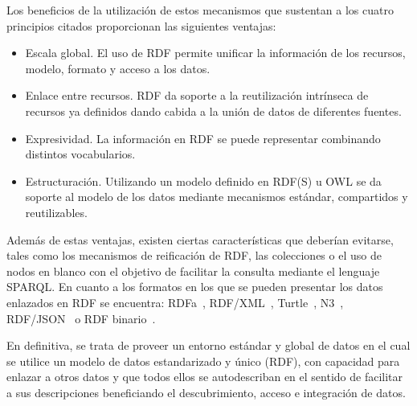 Los beneficios de la utilización de estos mecanismos que sustentan a los cuatro principios citados proporcionan las siguientes ventajas:
\begin{itemize}
 \item Escala global. El uso de \gls{RDF} permite unificar la información de los recursos, modelo, formato y acceso a los datos.
 \item Enlace entre recursos. RDF da soporte a la reutilización intrínseca de recursos ya definidos dando cabida
a la unión de datos de diferentes fuentes.
  \item Expresividad. La información en RDF se puede representar combinando distintos vocabularios.
 \item Estructuración. Utilizando un modelo definido en RDF(S) u \gls{OWL} se da soporte al modelo de los datos
mediante mecanismos estándar, compartidos y reutilizables.
\end{itemize}

Además de estas ventajas, existen ciertas características que deberían evitarse, tales como los mecanismos
de reificación de RDF, las colecciones o el uso de nodos en blanco con el objetivo de facilitar la consulta
mediante el lenguaje SPARQL. En cuanto a los formatos en los que se pueden presentar los datos enlazados en RDF se encuentra:
\gls{RDFa}~\cite{rdfa-primer}, \gls{RDF/XML}~\cite{rdf-syntax}, \gls{Turtle}~\cite{turtle-syntax}, \gls{N3}~\cite{n3-syntax}, \gls{RDF}/\gls{JSON}~\cite{rdf-binario} o RDF binario~\cite{rdf-json}.


En definitiva, se trata de proveer un entorno estándar y global de datos en el cual se utilice un modelo
de datos estandarizado y único (RDF), con capacidad para enlazar a otros datos y que todos ellos se autodescriban
en el sentido de facilitar a sus descripciones beneficiando el descubrimiento, acceso e integración de datos.

